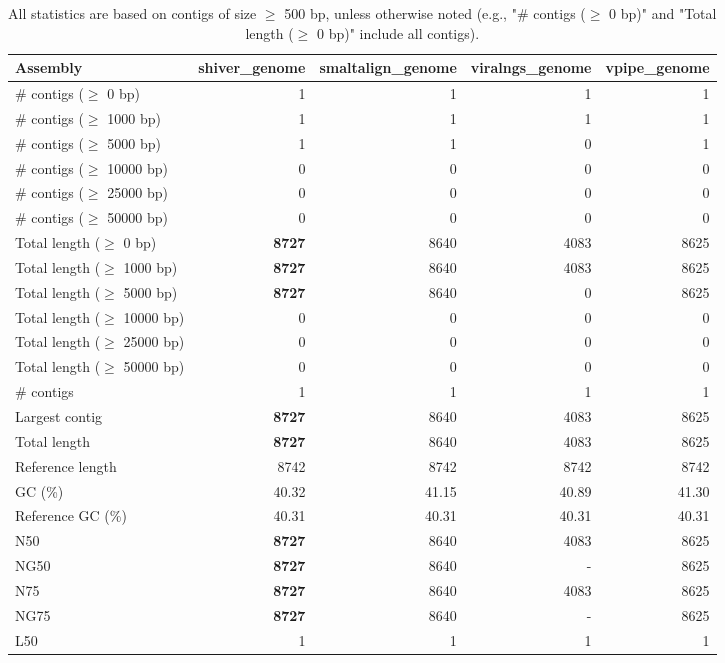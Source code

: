 \documentclass[12pt,a4paper]{article}
\begin{document}
\begin{table}[ht]
\begin{center}
\caption{All statistics are based on contigs of size $\geq$ 500 bp, unless otherwise noted (e.g., "\# contigs ($\geq$ 0 bp)" and "Total length ($\geq$ 0 bp)" include all contigs).}
\begin{tabular}{|l*{4}{|r}|}
\hline
Assembly & shiver\_genome & smaltalign\_genome & viralngs\_genome & vpipe\_genome \\ \hline
\# contigs ($\geq$ 0 bp) & 1 & 1 & 1 & 1 \\ \hline
\# contigs ($\geq$ 1000 bp) & 1 & 1 & 1 & 1 \\ \hline
\# contigs ($\geq$ 5000 bp) & 1 & 1 & 0 & 1 \\ \hline
\# contigs ($\geq$ 10000 bp) & 0 & 0 & 0 & 0 \\ \hline
\# contigs ($\geq$ 25000 bp) & 0 & 0 & 0 & 0 \\ \hline
\# contigs ($\geq$ 50000 bp) & 0 & 0 & 0 & 0 \\ \hline
Total length ($\geq$ 0 bp) & {\bf 8727} & 8640 & 4083 & 8625 \\ \hline
Total length ($\geq$ 1000 bp) & {\bf 8727} & 8640 & 4083 & 8625 \\ \hline
Total length ($\geq$ 5000 bp) & {\bf 8727} & 8640 & 0 & 8625 \\ \hline
Total length ($\geq$ 10000 bp) & 0 & 0 & 0 & 0 \\ \hline
Total length ($\geq$ 25000 bp) & 0 & 0 & 0 & 0 \\ \hline
Total length ($\geq$ 50000 bp) & 0 & 0 & 0 & 0 \\ \hline
\# contigs & 1 & 1 & 1 & 1 \\ \hline
Largest contig & {\bf 8727} & 8640 & 4083 & 8625 \\ \hline
Total length & {\bf 8727} & 8640 & 4083 & 8625 \\ \hline
Reference length & 8742 & 8742 & 8742 & 8742 \\ \hline
GC (\%) & 40.32 & 41.15 & 40.89 & 41.30 \\ \hline
Reference GC (\%) & 40.31 & 40.31 & 40.31 & 40.31 \\ \hline
N50 & {\bf 8727} & 8640 & 4083 & 8625 \\ \hline
NG50 & {\bf 8727} & 8640 & - & 8625 \\ \hline
N75 & {\bf 8727} & 8640 & 4083 & 8625 \\ \hline
NG75 & {\bf 8727} & 8640 & - & 8625 \\ \hline
L50 & 1 & 1 & 1 & 1 \\ \hline

\end{tabular}
\end{center}
\end{table}
\end{document}
